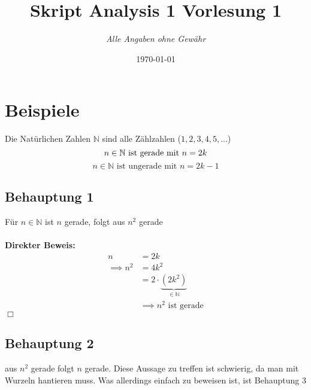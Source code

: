 \documentclass{article}
\title{Skript Analysis 1 Vorlesung 1} %
\author{\textit{Alle Angaben ohne Gewähr}} %
\date{\today} %
\begin{document}

	\maketitle %
    \section{Beispiele}
        Die Natürlichen Zahlen $\mathbb{N}$ sind alle Zählzahlen ($1,2,3,4,5,...$) \\
         $$n\in \mathbb{N} \text{ ist gerade mit } n=2k\\$$
         $$n\in \mathbb{N} \text{ ist ungerade mit } n=2k-1$$
        \subsection{Behauptung 1}
            Für $n\in \mathbb{N}$ ist $n$ gerade, folgt aus $n^2$ gerade\\\\
            \textbf{Direkter Beweis:}
            \begin{align*}
                n &= 2k \\
                \implies n^2 &= 4k^2 \\
                \, &= 2 \cdot \underbrace{(2k^2)}_{\in \mathbb{N}} \\
                &\implies n^2 \text{ ist gerade}
            \end{align*}
	    \hfill $\Box$
        \subsection{Behauptung 2}
            aus $n^2$ gerade folgt $n$ gerade. Diese Aussage zu treffen ist schwierig, da man mit Wurzeln hantieren muss. Was allerdings einfach zu beweisen ist, ist Behauptung 3
\end{document}
